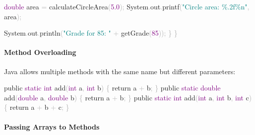 \documentclass[
  justified,
  openright,
]{tufte-book}
\let\subsubsection\paragraph
\let\paragraph\paragraph
\newcommand{\BuiltInTok}[1]{#1}
\newcommand{\ControlFlowTok}[1]{\textcolor{BrandBlue}{#1}}
\newcommand{\DataTypeTok}[1]{\textcolor{Purple}{#1}}
\newcommand{\DecValTok}[1]{\textcolor{Purple}{#1}}
\newcommand{\FloatTok}[1]{\textcolor{Purple}{#1}}
\newcommand{\FunctionTok}[1]{\textcolor{BrandBlue}{#1}}
\newcommand{\KeywordTok}[1]{\textcolor{BrandBlue}{#1}}
\newcommand{\NormalTok}[1]{#1}
\newcommand{\OperatorTok}[1]{\textcolor{DarkGray}{#1}}
\newcommand{\SpecialCharTok}[1]{\textcolor{Teal}{#1}}
\newcommand{\StringTok}[1]{\textcolor{Teal}{#1}}
\newenvironment{Shaded}{%
  \begin{snugshade}
}{%
  \end{snugshade}
}
\let\subsubsection\paragraph
\let\paragraph\paragraph
\begin{document}
\begin{Shaded}
\begin{Highlighting}[]
        \DataTypeTok{double}\NormalTok{ area }\OperatorTok{=} \FunctionTok{calculateCircleArea}\OperatorTok{(}\FloatTok{5.0}\OperatorTok{);}
        \BuiltInTok{System}\OperatorTok{.}\FunctionTok{out}\OperatorTok{.}\FunctionTok{printf}\OperatorTok{(}\StringTok{"Circle area: }\SpecialCharTok{\%.2f\%n}\StringTok{"}\OperatorTok{,}\NormalTok{ area}\OperatorTok{);}

        \BuiltInTok{System}\OperatorTok{.}\FunctionTok{out}\OperatorTok{.}\FunctionTok{println}\OperatorTok{(}\StringTok{"Grade for 85: "} \OperatorTok{+} \FunctionTok{getGrade}\OperatorTok{(}\DecValTok{85}\OperatorTok{));}
    \OperatorTok{\}}
\OperatorTok{\}}
\end{Highlighting}
\end{Shaded}

\subsubsection{Method Overloading}\label{method-overloading}

Java allows multiple methods with the same name but different
parameters:

\begin{Shaded}
\begin{Highlighting}[]
\KeywordTok{public} \DataTypeTok{static} \DataTypeTok{int} \FunctionTok{add}\OperatorTok{(}\DataTypeTok{int}\NormalTok{ a}\OperatorTok{,} \DataTypeTok{int}\NormalTok{ b}\OperatorTok{)} \OperatorTok{\{} \ControlFlowTok{return}\NormalTok{ a }\OperatorTok{+}\NormalTok{ b}\OperatorTok{;} \OperatorTok{\}}
\KeywordTok{public} \DataTypeTok{static} \DataTypeTok{double} \FunctionTok{add}\OperatorTok{(}\DataTypeTok{double}\NormalTok{ a}\OperatorTok{,} \DataTypeTok{double}\NormalTok{ b}\OperatorTok{)} \OperatorTok{\{} \ControlFlowTok{return}\NormalTok{ a }\OperatorTok{+}\NormalTok{ b}\OperatorTok{;} \OperatorTok{\}}
\KeywordTok{public} \DataTypeTok{static} \DataTypeTok{int} \FunctionTok{add}\OperatorTok{(}\DataTypeTok{int}\NormalTok{ a}\OperatorTok{,} \DataTypeTok{int}\NormalTok{ b}\OperatorTok{,} \DataTypeTok{int}\NormalTok{ c}\OperatorTok{)} \OperatorTok{\{} \ControlFlowTok{return}\NormalTok{ a }\OperatorTok{+}\NormalTok{ b }\OperatorTok{+}\NormalTok{ c}\OperatorTok{;} \OperatorTok{\}}
\end{Highlighting}
\end{Shaded}

\subsubsection{Passing Arrays to
Methods}\label{passing-arrays-to-methods}
\end{document}
